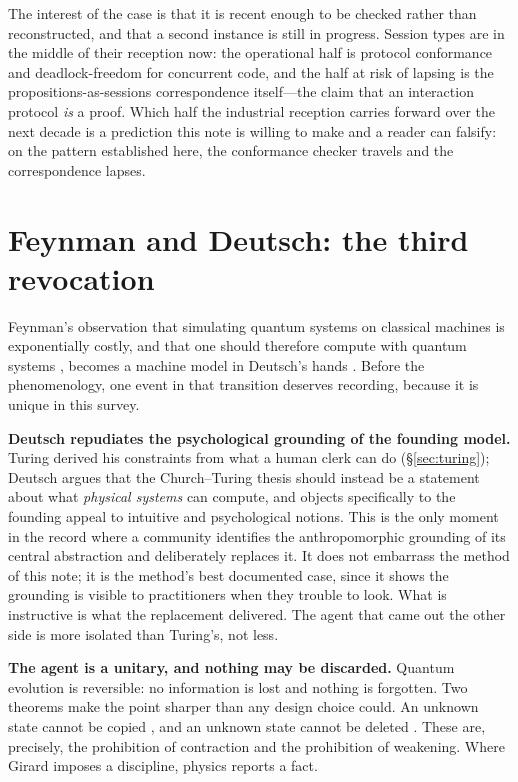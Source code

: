 \documentclass[11pt,a4paper]{article}
\begin{document}
The interest of the case is that it is recent enough to be checked rather than
reconstructed, and that a second instance is still in progress. Session types are
in the middle of their reception now: the operational half is protocol conformance
and deadlock-freedom for concurrent code, and the half at risk of lapsing is the
propositions-as-sessions correspondence itself---the claim that an interaction
protocol \emph{is} a proof. Which half the industrial reception carries forward
over the next decade is a prediction this note is willing to make and a reader can
falsify: on the pattern established here, the conformance checker travels and the
correspondence lapses.

\section{Feynman and Deutsch: the third revocation}
\label{sec:quantum}

Feynman's observation that simulating quantum systems on classical machines is
exponentially costly, and that one should therefore compute with quantum systems
\cite{feynman1982}, becomes a machine model in Deutsch's hands
\cite{deutsch1985,deutsch1989}. Before the phenomenology, one event in that
transition deserves recording, because it is unique in this survey.

\textbf{Deutsch repudiates the psychological grounding of the founding model.}
Turing derived his constraints from what a human clerk can do
(\S\ref{sec:turing}); Deutsch argues that the Church--Turing thesis should
instead be a statement about what \emph{physical systems} can compute, and
objects specifically to the founding appeal to intuitive and psychological
notions. This is the only moment in the record where a community identifies the
anthropomorphic grounding of its central abstraction and deliberately replaces
it. It does not embarrass the method of this note; it is the method's best
documented case, since it shows the grounding is visible to practitioners when
they trouble to look. What is instructive is what the replacement delivered. The
agent that came out the other side is more isolated than Turing's, not less.

\textbf{The agent is a unitary, and nothing may be discarded.} Quantum evolution
is reversible: no information is lost and nothing is forgotten. Two theorems make
the point sharper than any design choice could. An unknown state cannot be copied
\cite{wootters1982}, and an unknown state cannot be deleted
\cite{pati2000}. These are, precisely, the prohibition of contraction and the
prohibition of weakening. Where Girard imposes a discipline, physics reports a
fact.
\end{document}
